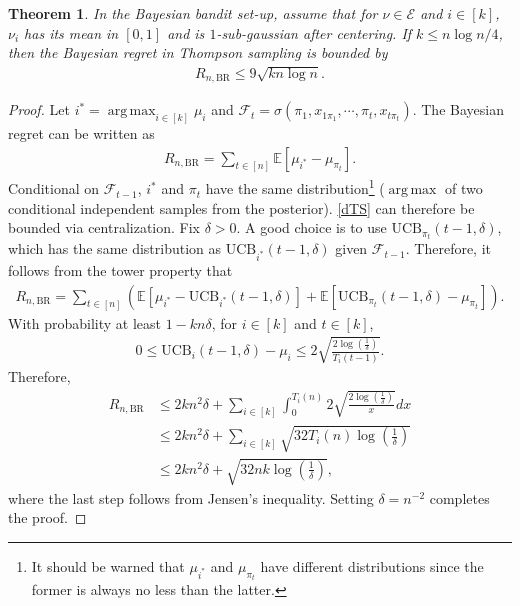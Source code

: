 \documentclass[letterpaper,11pt,openright,openany]{book}
\numberwithin{equation}{section}
\theoremstyle{plain}
\newtheorem{Th}{Theorem}[section]
\theoremstyle{definition}
\def\E{{\mathbb E}}
\def\BR{{\text{BR}}}
\DeclareMathOperator*{\argmax}{arg\,max}
\begin{document}
\begin{Th}
In the Bayesian bandit set-up, assume that for $\nu\in\mathcal E$ and $i\in [k]$, $\nu_i$ has its mean in $[0,1]$ and is $1$-sub-gaussian after centering. If $k\leq n\log n/4$, then the Bayesian regret in Thompson sampling is bounded by
\begin{align*}
R_{n,\BR}\leq 9\sqrt{kn\log n}. 
\end{align*}
\end{Th}

\begin{proof}
Let $i^*=\argmax_{i\in [k]}\mu_i$ and $\mathcal F_t = \sigma(\pi_1, x_{1\pi_1},\cdots, \pi_t, x_{t\pi_t})$. The Bayesian regret can be written as
\begin{align}
R_{n, \BR} = \sum_{t\in [n]}\E[\mu_{i^*}-\mu_{\pi_t}]. \label{dTS}
\end{align}
Conditional on $\mathcal F_{t-1}$, $i^*$ and $\pi_t$ have the same distribution\footnote{It should be warned that $\mu_{i^*}$ and $\mu_{\pi_t}$ have different distributions since the former is always no less than the latter.} ($\argmax$ of two conditional independent samples from the posterior). \eqref{dTS} can therefore be bounded via centralization. Fix $\delta>0$. A good choice is to use $\text{UCB}_{\pi_t}(t-1,\delta)$, which has the same distribution as $\text{UCB}_{i^*}(t-1,\delta)$ given $\mathcal F_{t-1}$.  Therefore, it follows from the tower property that
\begin{align*}
R_{n, \BR} =  \sum_{t\in [n]}\left(\E[\mu_{i^*}-\text{UCB}_{i^*}(t-1,\delta)]+\E[\text{UCB}_{\pi_t}(t-1,\delta)-\mu_{\pi_t}]\right).
\end{align*}
With probability at least $1-kn\delta$, for $i\in [k]$ and $t\in [k]$,
\begin{align*}
0\leq \text{UCB}_{i}(t-1,\delta)-\mu_{i}\leq 2\sqrt{\frac{2\log\left(\frac{1}{\delta}\right)}{T_i(t-1)}}.
\end{align*}
Therefore,
\begin{align*}
R_{n,\BR}&\leq 2kn^2\delta + \sum_{i\in [k]}\int_{0}^{T_{i}(n)}2\sqrt{\frac{2\log\left(\frac{1}{\delta}\right)}{x}}dx\\
&\leq 2kn^2\delta + \sum_{i\in [k]}\sqrt{32T_i(n)\log\left(\frac{1}{\delta}\right)}\\
&\leq 2kn^2\delta+\sqrt{32nk\log\left(\frac{1}{\delta}\right)},
\end{align*}
where the last step follows from Jensen's inequality. Setting $\delta=n^{-2}$ completes the proof. 
\end{proof}
\end{document}
